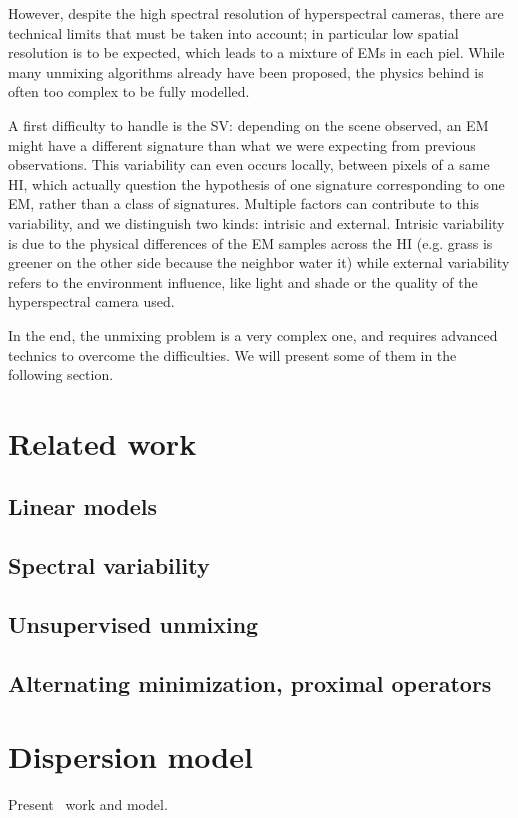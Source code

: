 \documentclass[conference]{IEEEtran}
\begin{document}
However, despite the high spectral resolution of hyperspectral cameras, there are technical limits that must be taken into account; in particular low spatial resolution is to be expected, which leads to a mixture of EMs in each piel. While many unmixing algorithms already have been proposed, the physics behind is often too complex to be fully modelled.

A first difficulty to handle is the SV: depending on the scene observed, an EM might have a different signature than what we were expecting from previous observations. This variability can even occurs locally, between pixels of a same HI, which actually question the hypothesis of one signature corresponding to one EM, rather than a class of signatures. Multiple factors can contribute to this variability, and we distinguish two kinds: intrisic and external. Intrisic variability is due to the physical differences of the EM samples across the HI (e.g. grass is greener on the other side because the neighbor water it) while external variability refers to the environment influence, like light and shade or the quality of the hyperspectral camera used.

In the end, the unmixing problem is a very complex one, and requires advanced technics to overcome the difficulties. We will present some of them in the following section.
\section{Related work}
\subsection{Linear models}

\subsection{Spectral variability}

\subsection{Unsupervised unmixing}

\subsection{Alternating minimization, proximal operators}

\section{Dispersion model}
Present~\cite{janiczek_differentiable_2020} work and model.
\end{document}
